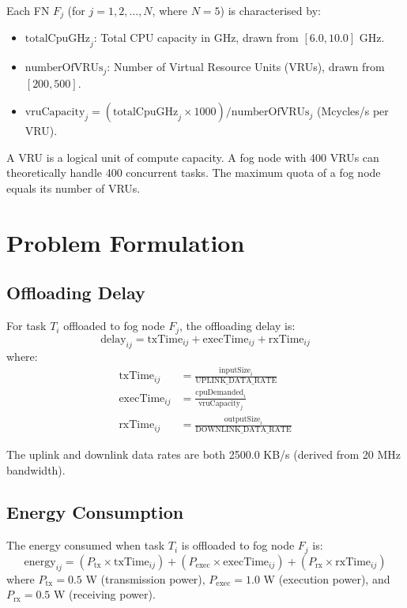 Each FN $F_j$ (for $j = 1, 2, \ldots, N$, where $N = 5$) is characterised by:
\begin{itemize}
\item $\text{totalCpuGHz}_j$: Total CPU capacity in GHz, drawn from $[6.0, 10.0]$ GHz.
\item $\text{numberOfVRUs}_j$: Number of Virtual Resource Units (VRUs), drawn from $[200, 500]$.
\item $\text{vruCapacity}_j = (\text{totalCpuGHz}_j \times 1000) / \text{numberOfVRUs}_j$ (Mcycles/s per VRU).
\end{itemize}

A VRU is a logical unit of compute capacity. A fog node with 400 VRUs can theoretically handle 400 concurrent tasks. The maximum quota of a fog node equals its number of VRUs.

\section{Problem Formulation}

\subsection{Offloading Delay}

For task $T_i$ offloaded to fog node $F_j$, the offloading delay is:
\begin{equation}
\text{delay}_{ij} = \text{txTime}_{ij} + \text{execTime}_{ij} + \text{rxTime}_{ij}
\end{equation}
where:
\begin{align}
\text{txTime}_{ij} &= \frac{\text{inputSize}_i}{\text{UPLINK\_DATA\_RATE}} \\
\text{execTime}_{ij} &= \frac{\text{cpuDemanded}_i}{\text{vruCapacity}_j} \\
\text{rxTime}_{ij} &= \frac{\text{outputSize}_i}{\text{DOWNLINK\_DATA\_RATE}}
\end{align}

The uplink and downlink data rates are both 2500.0 KB/s (derived from 20 MHz bandwidth).

\subsection{Energy Consumption}

The energy consumed when task $T_i$ is offloaded to fog node $F_j$ is:
\begin{equation}
\text{energy}_{ij} = (P_{\text{tx}} \times \text{txTime}_{ij}) + (P_{\text{exec}} \times \text{execTime}_{ij}) + (P_{\text{rx}} \times \text{rxTime}_{ij})
\end{equation}
where $P_{\text{tx}} = 0.5$ W (transmission power), $P_{\text{exec}} = 1.0$ W (execution power), and $P_{\text{rx}} = 0.5$ W (receiving power).

